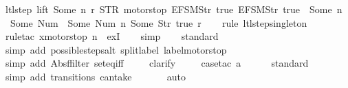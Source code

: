 \begin{isabellebody}
\ ltl{\isacharunderscore}step\ lift\ {\isacharparenleft}Some\ n{\isacharparenright}\ r\ {\isacharparenleft}STR\ {\isacharprime}{\isacharprime}motorstop{\isacharprime}{\isacharprime}{\isacharcomma}\ {\isacharbrackleft}EFSM{\isachardot}Str\ {\isacharprime}{\isacharprime}true{\isacharprime}{\isacharprime}{\isacharcomma}\ EFSM{\isachardot}Str\ {\isacharprime}{\isacharprime}true{\isacharprime}{\isacharprime}{\isacharbrackright}{\isacharparenright}\ {\isacharequal}\ {\isacharparenleft}Some\ {\isacharparenleft}n\ {\isacharplus}\ {}{\isacharparenright}{\isacharcomma}\ {\isacharbrackleft}Some\ {\isacharparenleft}Num\ {}{\isacharparenright}{\isacharcomma}\ Some\ {\isacharparenleft}Num\ n{\isacharparenright}{\isacharcomma}\ Some\ {\isacharparenleft}Str\ {\isacharprime}{\isacharprime}true{\isacharprime}{\isacharprime}{\isacharparenright}{\isacharbrackright}{\isacharcomma}\ r{\isacharparenright}{\isachardoublequoteclose}\isanewline
%
\isadelimproof
\ \ %
\endisadelimproof
%
\isatagproof
{}\isamarkupfalse%
\ {\isacharparenleft}rule\ ltl{\isacharunderscore}step{\isacharunderscore}singleton{\isacharparenright}\isanewline
\ \ \isamarkupfalse%
\ {\isacharparenleft}rule{\isacharunderscore}tac\ x{\isacharequal}{\isachardoublequoteopen}motorstop\ n{\isachardoublequoteclose}\ \ exI{\isacharparenright}\isanewline
\ \ \isamarkupfalse%
\ simp\isanewline
\ \ \isamarkupfalse%
\ standard\isanewline
\ \ \ \isamarkupfalse%
\ {\isacharparenleft}simp\ add{\isacharcolon}\ possible{\isacharunderscore}steps{\isacharunderscore}alt{}\ split{\isacharunderscore}label\ label{\isacharunderscore}motorstop{\isacharparenright}\isanewline
\ \ \ \isamarkupfalse%
\ {\isacharparenleft}simp\ add{\isacharcolon}\ Abs{\isacharunderscore}ffilter\ set{\isacharunderscore}eq{\isacharunderscore}iff{\isacharparenright}\isanewline
\ \ \ \isamarkupfalse%
\ clarify\isanewline
\ \ \ \isamarkupfalse%
\ {\isacharparenleft}case{\isacharunderscore}tac\ {\isachardoublequoteopen}a{\isacharequal}{}{\isachardoublequoteclose}{\isacharparenright}\isanewline
\ \ \ \ \isamarkupfalse%
\ standard\isanewline
\ \ \ \ \ \isamarkupfalse%
\ {\isacharparenleft}simp\ add{\isacharcolon}\ transitions\ can{\isacharunderscore}take{\isacharparenright}\isanewline
\ \ \ \ \ \isamarkupfalse%
\ auto{\isacharbrackleft}{}{\isacharbrackright}\isanewline
\ \ \ \ \isamarkupfalse%

\end{isabellebody}
